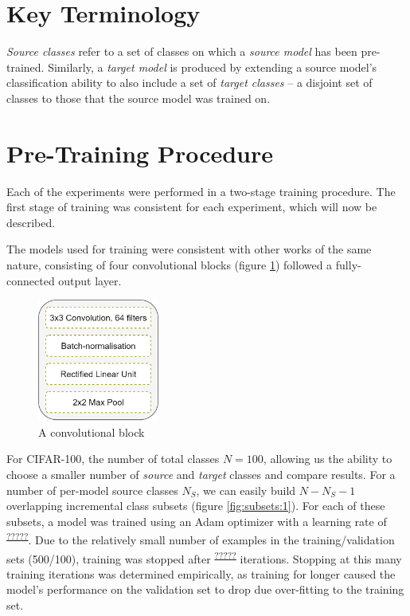 \documentclass{report}
\newcommand{\TOCITE}[2][citation needed]{\textsuperscript{\underline{#1}}}
\begin{document}
	\section{Key Terminology}
	\textit{Source classes} refer to a set of classes on which a \textit{source model} has been pre-trained. Similarly, a \textit{target model} is produced by extending a source model's classification ability to also include a set of \textit{target classes} -- a disjoint set of classes to those that the source model was trained on. \par
	
	\section{Pre-Training Procedure}
	Each of the experiments were performed in a two-stage training procedure. The first stage of training was consistent for each experiment, which will now be described. \par
	The models used for training were consistent with other works of the same nature, consisting of four convolutional blocks (figure \ref{fig:convblock:1}) followed a fully-connected output layer. \par
	\begin{figure}[h]
		\centering
		\includegraphics[width=4cm]{convblock}
		\caption{A convolutional block}
		\label{fig:convblock:1}
	\end{figure}
	For CIFAR-100, the number of total classes $N=100$, allowing us the ability to choose a smaller number of \emph{source} and \emph{target} classes and compare results. For a number of per-model source classes $N_S$, we can easily build $N-N_S-1$ overlapping incremental class subsets (figure \ref{fig:subsets:1}).
	For each of these subsets, a model was trained using an Adam optimizer with a learning rate of \TOCITE[?????]{}. Due to the relatively small number of examples in the training/validation sets (500/100), training was stopped after \TOCITE[?????]{} iterations. Stopping at this many training iterations was determined empirically, as training for longer caused the model's performance on the validation set to drop due over-fitting to the training set. \par
\end{document}
